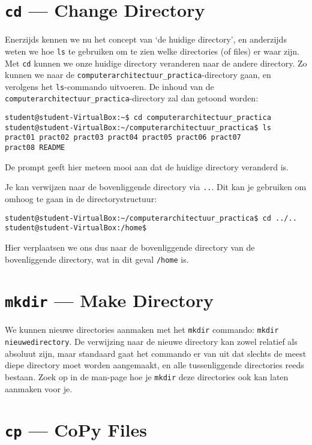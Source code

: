 \documentclass[a4paper,twoside,openany]{memoir}
\begin{document}
\section{\texttt{cd} --- Change Directory}

Enerzijds kennen we nu het concept van `de huidige directory', en anderzijds
weten we hoe \verb!ls! te gebruiken om te zien welke directories (of files) er
waar zijn. Met \verb!cd! kunnen we onze huidige directory veranderen naar de
andere directory. Zo kunnen we naar de
\verb!computerarchitectuur_practica!-directory gaan, en verolgens het
\verb!ls!-commando uitvoeren. De inhoud van de
\verb!computerarchitectuur_practica!-directory zal dan getoond worden:

\begin{verbatim}
student@student-VirtualBox:~$ cd computerarchitectuur_practica
student@student-VirtualBox:~/computerarchitectuur_practica$ ls
pract01 pract02 pract03 pract04 pract05 pract06 pract07
pract08 README
\end{verbatim}

De prompt geeft hier meteen mooi aan dat de huidige directory veranderd is.

Je kan verwijzen naar de bovenliggende directory via \verb!..!. Dit kan je
gebruiken om omhoog te gaan in de directorystructuur:
\begin{verbatim}
student@student-VirtualBox:~/computerarchitectuur_practica$ cd ../..
student@student-VirtualBox:/home$ 
\end{verbatim}

Hier verplaatsen we ons dus naar de bovenliggende directory van de bovenliggende
directory, wat in dit geval \verb!/home! is.

\section{\texttt{mkdir} --- Make Directory}

We kunnen nieuwe directories aanmaken met het \verb!mkdir! commando: \verb!mkdir nieuwedirectory!. De verwijzing naar de nieuwe directory kan zowel relatief als
absoluut zijn, maar standaard gaat het commando er van uit dat slechts de meest
diepe directory moet worden aangemaakt, en alle tussenliggende directories reeds
bestaan. Zoek op in de man-page hoe je \verb!mkdir! deze directories ook kan
laten aanmaken voor je.

\section{\texttt{cp} --- CoPy Files}
\end{document}
